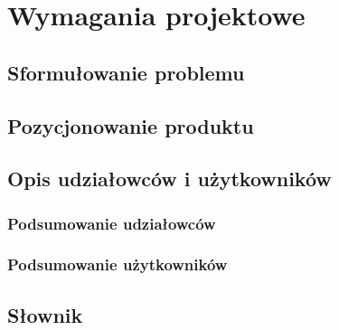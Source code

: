 \chapter{Wymagania projektowe}
\section{Sformułowanie problemu}
\section{Pozycjonowanie produktu}
\section{Opis udziałowców i użytkowników}
\subsection{Podsumowanie udziałowców}
\subsection{Podsumowanie użytkowników}
\section{Słownik}